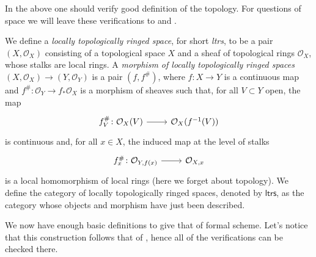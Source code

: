 \begin{rem}[]
	In the above one should verify good definition of the topology.
	For questions of space we will leave these verifications to
	\cite[\href{https://stacks.math.columbia.edu/tag/0AHY}{Section 0AHY}]{SP}
	and \cite[Chapter I, \S10]{EGA}.
\end{rem}


\begin{defn}
	We define a \emph{locally topologically ringed space}, 
	for short \emph{ltrs}, to be a pair
	$( X , \mathcal{O}_{ X } )$ consisting of a topological space $X$
	and a sheaf of topological rings $\mathcal{O}_X$,
	whose stalks are local rings.
	A \emph{morphism of locally topologically ringed spaces}
	$( X , \mathcal{O}_{ X } ) \to  ( Y , \mathcal{O}_{ Y } )$
	is a pair $\left(f, f^\#\right)$,
	where $f\colon X \to Y$ is a continuous map
	and $f^\#\colon \mathcal{O}_Y \to f_* \mathcal{O}_X$ is
	a morphism of sheaves such that, for all $V \subset Y$ open,
	the map
	\begin{equation*}
	\begin{tikzcd}[row sep = 0ex
		,/tikz/column 1/.append style={anchor=base east}
		,/tikz/column 2/.append style={anchor=base west}]
		f^\#_V\colon \mathcal{O}_{ X }(V) \arrow[r, "", rightarrow] &
		\mathcal{O}_{ X }(f^{-1}(V))
	\end{tikzcd}
	\end{equation*} 
	is continuous and, for all $x \in X$, the induced map at the level
	of stalks
	\begin{equation*}
	\begin{tikzcd}[row sep = 0ex
		,/tikz/column 1/.append style={anchor=base east}
		,/tikz/column 2/.append style={anchor=base west}]
		f^\#_x\colon \mathcal{O}_{ Y,f(x) } \arrow[r, "", rightarrow] &
		\mathcal{O}_{ X,x }
	\end{tikzcd}
	\end{equation*} 
	is a local homomorphism of local rings (here we forget about topology).
	We define the category of locally topologically ringed spaces,
	denoted by \(\mathsf{ltrs}\), as the category whose objects and morphism
	have just been described.
\end{defn}


\noindent
We now have enough basic definitions to give that of formal scheme.
Let's notice that this construction follows that of \cite[Chapter I, \S10]{EGA},
hence all of the verifications can be checked there.


